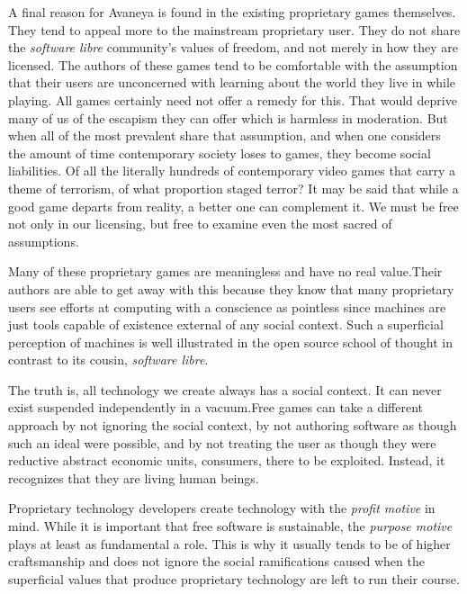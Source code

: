 A final reason for Avaneya is found in the existing proprietary games themselves. They tend to appeal more to the mainstream proprietary user. They do not share the {\it software libre} community's values of freedom, and not merely in how they are licensed. The authors of these games tend to be comfortable with the assumption that their users are unconcerned with learning about the world they live in while playing. All games certainly need not offer a remedy for this. That would deprive many of us of the escapism they can offer which is harmless in moderation. But when all of the most prevalent share that assumption, and when one considers the amount of time contemporary society loses to games, they become social liabilities. Of all the literally hundreds of contemporary video games that carry a theme of terrorism, of what proportion staged terror? It may be said that while a good game departs from reality, a better one can complement it. We must be free not only in our licensing, but free to examine even the most sacred of assumptions.

Many of these proprietary games are meaningless and have no real value. Their authors are able to get away with this because they know that many proprietary users see efforts at computing with a conscience as pointless since machines are just tools capable of existence external of any social context. Such a superficial perception of machines is well illustrated in the open source school of thought in contrast to its cousin, {\it software libre}.

The truth is, all technology we create always has a social context. It can never exist suspended independently in a vacuum.\footnotecite[black2012] Free games can take a different approach by not ignoring the social context, by not authoring software as though such an ideal were possible, and by not treating the user as though they were reductive abstract economic units, consumers, there to be exploited. Instead, it recognizes that they are living human beings. 

Proprietary technology developers create technology with the {\it profit motive} in mind. While it is important that free software is sustainable, the {\it purpose motive} plays at least as fundamental a role. This is why it usually tends to be of higher craftsmanship and does not ignore the social ramifications caused when the superficial values that produce proprietary technology are left to run their course.

